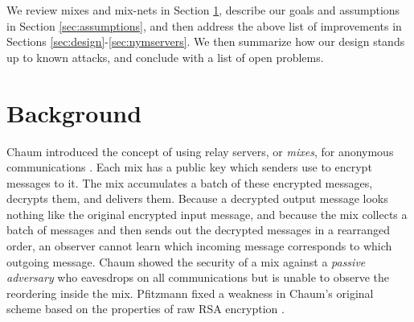 \documentclass[final]{ieee}
\begin{document}

We review mixes and mix-nets in Section \ref{sec:background},
describe our goals and assumptions in Section \ref{sec:assumptions},
and then address the above list of improvements in Sections
\ref{sec:design}-\ref{sec:nymservers}. We then summarize how our design
stands up to known attacks, and conclude with a list of open problems.



%


\section{Background}
\label{sec:background}

Chaum introduced the concept of using relay servers, or \emph{mixes},
for anonymous communications \cite{chaum-mix}. Each mix has a public key
which senders use to encrypt messages to it. The mix accumulates a batch
of these encrypted messages, decrypts them, and delivers them. Because
a decrypted output message looks nothing like the original encrypted
input message,
and because the mix collects a batch of messages and then sends out the
decrypted messages in a rearranged order, an observer cannot learn which incoming
message corresponds to which outgoing message. Chaum showed the
security of a mix against a \emph{passive adversary} who eavesdrops on
all communications but is unable to observe the reordering inside the mix.
Pfitzmann fixed a weakness in Chaum's original scheme based on the
properties of raw RSA encryption \cite{pfitzmann90how}.
\end{document}
